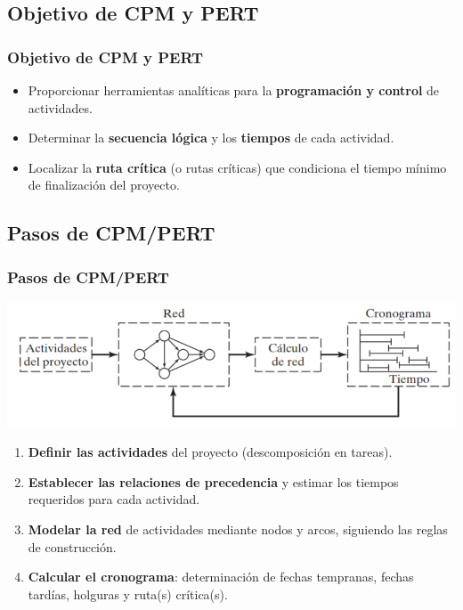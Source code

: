\documentclass{beamer}
\begin{document}
\subsection{Objetivo de CPM y PERT}
\begin{frame}
\frametitle{Objetivo de CPM y PERT}

\begin{itemize}
    \item Proporcionar herramientas analíticas para la \textbf{programación y control} de actividades.
    \item Determinar la \textbf{secuencia lógica} y los \textbf{tiempos} de cada actividad.
    \item Localizar la \textbf{ruta crítica} (o rutas críticas) que condiciona el tiempo mínimo de finalización del proyecto.
\end{itemize}

\end{frame}

\subsection{Pasos de CPM/PERT}
\begin{frame}
\frametitle{Pasos de CPM/PERT}

\begin{center}
    \includegraphics[scale=0.4]{images/fases_proyecto.png}
\end{center}
\begin{enumerate}
    \item \textbf{Definir las actividades} del proyecto (descomposición en tareas).
    \item \textbf{Establecer las relaciones de precedencia} y estimar los tiempos requeridos para cada actividad.
    \item \textbf{Modelar la red} de actividades mediante nodos y arcos, siguiendo las reglas de construcción.
    \item \textbf{Calcular el cronograma}: determinación de fechas tempranas, fechas tardías, holguras y ruta(s) crítica(s).
\end{enumerate}

\end{frame}
\end{document}
